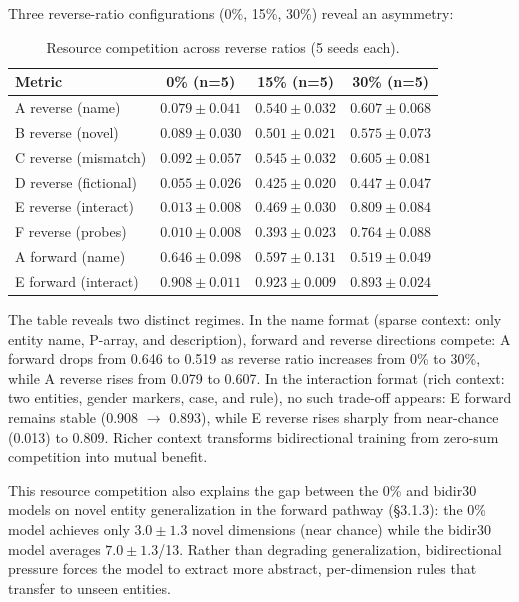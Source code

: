 \documentclass{article}
\begin{document}
Three reverse-ratio configurations (0\%, 15\%, 30\%) reveal an asymmetry:

\begin{table}[htbp]
\centering
\small
\begin{tabular}{lccc}
\toprule
Metric & 0\% (n=5) & 15\% (n=5) & 30\% (n=5) \\
\midrule
A reverse (name) & $0.079 \pm 0.041$ & $0.540 \pm 0.032$ & $0.607 \pm 0.068$ \\
B reverse (novel) & $0.089 \pm 0.030$ & $0.501 \pm 0.021$ & $0.575 \pm 0.073$ \\
C reverse (mismatch) & $0.092 \pm 0.057$ & $0.545 \pm 0.032$ & $0.605 \pm 0.081$ \\
D reverse (fictional) & $0.055 \pm 0.026$ & $0.425 \pm 0.020$ & $0.447 \pm 0.047$ \\
E reverse (interact) & $0.013 \pm 0.008$ & $0.469 \pm 0.030$ & $0.809 \pm 0.084$ \\
F reverse (probes) & $0.010 \pm 0.008$ & $0.393 \pm 0.023$ & $0.764 \pm 0.088$ \\
A forward (name) & $0.646 \pm 0.098$ & $0.597 \pm 0.131$ & $0.519 \pm 0.049$ \\
E forward (interact) & $0.908 \pm 0.011$ & $0.923 \pm 0.009$ & $0.893 \pm 0.024$ \\
\bottomrule
\end{tabular}
\caption{Resource competition across reverse ratios (5 seeds each).}
\label{tab:resource}
\end{table}

The table reveals two distinct regimes. In the name format (sparse context: only entity name, P-array, and description), forward and reverse directions compete: A forward drops from 0.646 to 0.519 as reverse ratio increases from 0\% to 30\%, while A reverse rises from 0.079 to 0.607. In the interaction format (rich context: two entities, gender markers, case, and rule), no such trade-off appears: E forward remains stable (0.908 $\rightarrow$ 0.893), while E reverse rises sharply from near-chance (0.013) to 0.809. Richer context transforms bidirectional training from zero-sum competition into mutual benefit.

This resource competition also explains the gap between the 0\% and bidir30 models on novel entity generalization in the forward pathway (\S3.1.3): the 0\% model achieves only $3.0 \pm 1.3$ novel dimensions (near chance) while the bidir30 model averages $7.0 \pm 1.3$/13. Rather than degrading generalization, bidirectional pressure forces the model to extract more abstract, per-dimension rules that transfer to unseen entities.
\end{document}
